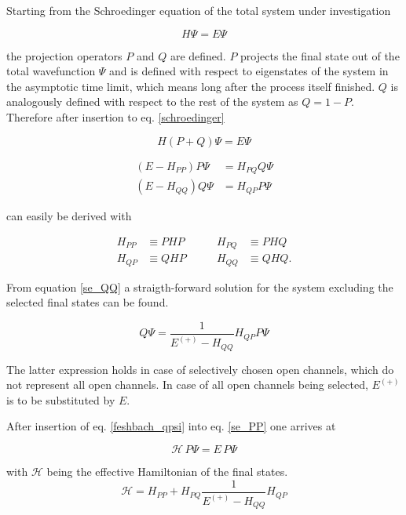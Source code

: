 Starting from the Schroedinger equation of the total system under investigation

\begin{equation}
  H \Psi = E \Psi \label{schroedinger}
\end{equation}

the projection operators $P$ and $Q$ are defined. $P$ projects the final state out
of the total wavefunction $\Psi$ and is defined with respect to eigenstates
of the system in the asymptotic time limit, which means long after the process
itself finished. $Q$ is analogously defined with respect to the rest of the
system as $Q = 1 - P$. Therefore after insertion to eq. \ref{schroedinger}

\begin{equation}
  H (P+Q) \Psi = E \Psi
\end{equation}

\begin{align}
  (E - H_{PP}) P \Psi & = H_{PQ} Q \Psi \label{se_PP}\\
  (E - H_{QQ}) Q \Psi & = H_{QP} P \Psi \label{se_QQ}
\end{align}

can easily be derived with

\begin{align*}
  H_{PP} & \equiv PHP & \quad\quad H_{PQ} & \equiv PHQ\\
  H_{QP} & \equiv QHP & \quad\quad H_{QQ} & \equiv QHQ .
\end{align*}

From equation \ref{se_QQ} a straigth-forward solution for the system excluding
the selected final states can be found.

\begin{equation}
  Q \Psi = \frac{1}{E^{(+)}-H_{QQ}} H_{QP} P \Psi \label{feshbach_qpsi}
\end{equation}

The latter expression holds in case of selectively chosen open channels, which
do not represent all open channels. In case of all open channels being selected,
$E^{(+)}$ is to be substituted by $E$.

After insertion of eq. \ref{feshbach_qpsi} into eq. \ref{se_PP} one arrives at

\begin{equation}
  \mathscr{H} \,P \Psi = E \,P \Psi \label{se_ppsi}
\end{equation}

with $\mathscr{H}$ being the effective Hamiltonian of the final states.
\begin{equation}
  \mathscr{H} = H_{PP} + H_{PQ} \frac{1}{E^{(+)}-H_{QQ}} H_{QP}
\end{equation}

